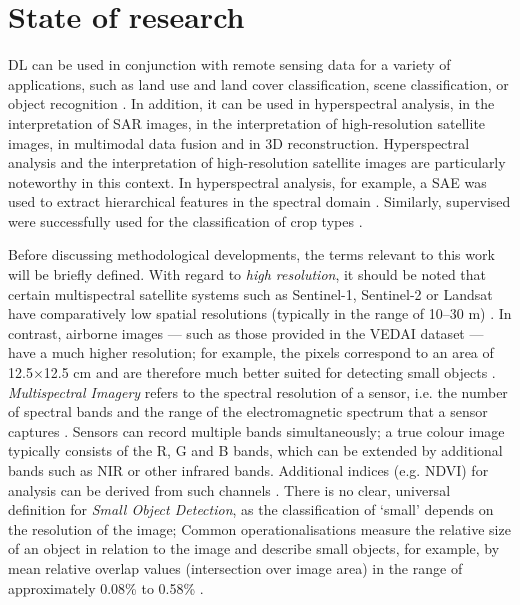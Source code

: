\chapter{State of research}
\label{ch:state_of_research}


\acrlong{DL} can be used in conjunction with remote sensing data for a variety of applications, such as land use and land cover classification, scene classification, or object recognition \cite{Zhu2017}. In addition, it can be used in hyperspectral analysis, in the interpretation of \acrshort{SAR} images, in the interpretation of high-resolution satellite images, in multimodal data fusion and in 3D reconstruction. Hyperspectral analysis and the interpretation of high-resolution satellite images are particularly noteworthy in this context. In hyperspectral analysis, for example, a \acrfull{SAE} was used to extract hierarchical features in the spectral domain \cite{Chen2014}. Similarly, supervised  were successfully used for the classification of crop types \cite{Kussul2017}.

Before discussing methodological developments, the terms relevant to this work will be briefly defined. With regard to \emph{high resolution}, it should be noted that certain multispectral satellite systems such as Sentinel-1, Sentinel-2 or Landsat have comparatively low spatial resolutions (typically in the range of 10–30 m) \cite{Wieland2023}. In contrast, airborne images — such as those provided in the \acrshort{VEDAI} dataset — have a much higher resolution; for example, the pixels correspond to an area of 12.5\(\times\)12.5 cm and are therefore much better suited for detecting small objects \cite{Razakarivony2015}. \emph{Multispectral Imagery} refers to the spectral resolution of a sensor, i.e. the number of spectral bands and the range of the electromagnetic spectrum that a sensor captures \cite{Khan2018}. Sensors can record multiple bands simultaneously; a true colour image typically consists of the \Acrfull{R}, \Acrfull{G} and \Acrfull{B} bands, which can be extended by additional bands such as \acrfull{NIR} or other infrared bands. Additional indices (e.g. \acrfull{NDVI}) for analysis can be derived from such channels \cite{Wiley2018}. There is no clear, universal definition for \emph{Small Object Detection}, as the classification of ‘small’ depends on the resolution of the image; Common operationalisations measure the relative size of an object in relation to the image and describe small objects, for example, by mean relative overlap values (intersection over image area) in the range of approximately 0.08\% to 0.58\% \cite{Chen2017}.

